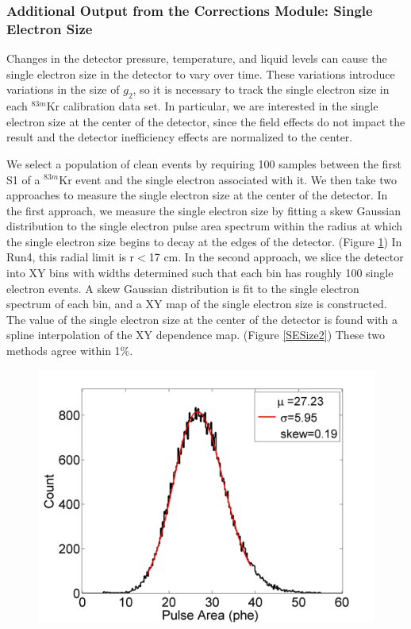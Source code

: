 \subsubsection{Additional Output from the Corrections Module: Single Electron Size}

Changes in the detector pressure, temperature, and liquid levels can cause the single electron size in the detector to vary over time.  These variations introduce variations in the size of $g_2$, so it is necessary to track the single electron size in each $^{83m}$Kr calibration data set.  In particular, we are interested in the single electron size at the center of the detector, since the field effects do not impact the result and the detector inefficiency effects are normalized to the center. 

We select a population of clean events by requiring 100 samples between the first S1 of a $^{83m}$Kr event and the single electron associated with it.  We then take two approaches to measure the single electron size at the center of the detector.  In the first approach, we measure the single electron size by fitting a skew Gaussian distribution to the single electron pulse area spectrum within the radius at which the single electron size begins to decay at the edges of the detector. (Figure \ref{SESize1}) In Run4, this radial limit is r$<$17 cm. In the second approach, we slice the detector into XY bins with widths determined such that each bin has roughly 100 single electron events.  A skew Gaussian distribution is fit to the single electron spectrum of each bin, and a XY map of the single electron size is constructed.  The value of the single electron size at the center of the detector is found with a spline interpolation of the XY dependence map.  (Figure \ref{SESize2})  These two methods agree within 1\%.

\begin{figure}[!h]
\includegraphics[scale=0.5]{Run04Corrections/SESizeExample.png}
 \label{SESize1}
\end{figure}

